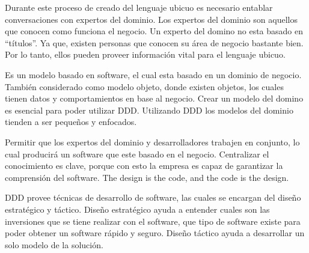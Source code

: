\documentclass[12pt,twoside]{reedthesis}
\theoremstyle{definition}
\theoremstyle{definition}
\theoremstyle{definition}
\theoremstyle{remark}
\begin{document}
Durante este proceso de creado del lenguaje ubicuo es necesario entablar
conversaciones con expertos del dominio. Los expertos del dominio son
aquellos que conocen como funciona el negocio. Un experto del domino no
esta basado en ``títulos''. Ya que, existen personas que conocen su área
de negocio bastante bien. Por lo tanto, ellos pueden proveer información
vital para el lenguaje ubicuo.

Es un modelo basado en software, el cual esta basado en un dominio de
negocio. También considerado como modelo objeto, donde existen objetos,
los cuales tienen datos y comportamientos en base al negocio. Crear un
modelo del domino es esencial para poder utilizar DDD. Utilizando DDD
los modelos del dominio tienden a ser pequeños y enfocados.

Permitir que los expertos del dominio y desarrolladores trabajen en
conjunto, lo cual producirá un software que este basado en el negocio.
Centralizar el conocimiento es clave, porque con esto la empresa es
capaz de garantizar la comprensión del software. The design is the code,
and the code is the design.

DDD provee técnicas de desarrollo de software, las cuales se encargan
del diseño estratégico y táctico. Diseño estratégico ayuda a entender
cuales son las inversiones que se tiene realizar con el software, que
tipo de software existe para poder obtener un software rápido y seguro.
Diseño táctico ayuda a desarrollar un solo modelo de la solución.
\end{document}
